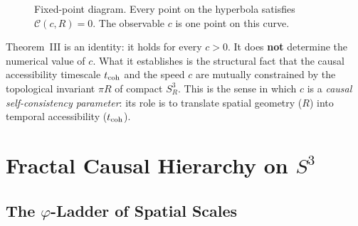 \documentclass[12pt,a4paper]{article}
\theoremstyle{plain}
\theoremstyle{definition}
\theoremstyle{remark}
\begin{document}
\begin{figure}[h!]
\centering
{}
\caption{Fixed-point diagram. Every point on the hyperbola satisfies
  $\mathcal{C}(c,R)=0$. The observable $c$ is one point on this curve.}
\label{fig:fixedpoint}
\end{figure}

\begin{tcolorbox}[remarkbox={Remark 5.1 — What Theorem~III Does and Does Not Say}]
Theorem~III is an identity: it holds for every $c > 0$.
It does \textbf{not} determine the numerical value of $c$.
What it establishes is the structural fact that the causal accessibility timescale
$t_{\rm coh}$ and the speed $c$ are mutually constrained by the topological
invariant $\pi R$ of compact $S^3_R$.
This is the sense in which $c$ is a \emph{causal self-consistency parameter}:
its role is to translate spatial geometry ($R$) into temporal accessibility ($t_{\rm coh}$).
\end{tcolorbox}

\section{Fractal Causal Hierarchy on \texorpdfstring{$S^3$}{S3}}
\label{sec:fractal}

\subsection{The \texorpdfstring{$\varphi$}{phi}-Ladder of Spatial Scales}
\end{document}
